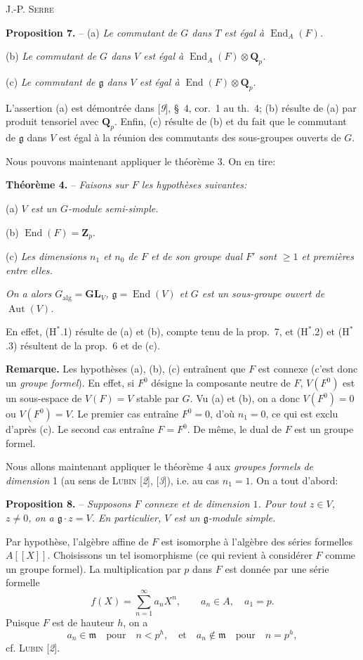 \begin{center}\small J.-P. \textsc{Serre}\end{center}
\textbf{Proposition 7.} -- (a) \textit{Le commutant de $G$ dans $T$ est égal à $\operatorname{End}_A(F)$.}

(b) \textit{Le commutant de $G$ dans $V$ est égal à $\operatorname{End}_A(F)\otimes\mathbf{Q}_p$.}

(c) \textit{Le commutant de $\mathfrak{g}$ dans $V$ est égal à $\operatorname{End}(F)\otimes\mathbf{Q}_p$.}

L’assertion (a) est démontrée dans [\textit{9}], \S~4, cor.~1 au th.~4; (b) résulte de (a) par produit tensoriel avec $\mathbf{Q}_p$. Enfin, (c) résulte de (b) et du fait que le commutant de $\mathfrak{g}$ dans $V$ est égal à la réunion des commutants des sous-groupes ouverts de $G$.

Nous pouvons maintenant appliquer le théorème 3. On en tire:

\textbf{Théorème 4.} -- \textit{Faisons sur $F$ les hypothèses suivantes:}

(a) \textit{$V$ est un $G$-module semi-simple.}

(b) $\operatorname{End}(F)=\mathbf{Z}_p$.

(c) \textit{Les dimensions $n_1$ et $n_0$ de $F$ et de son groupe dual $F'$ sont $\geqslant 1$ et premières entre elles.}

\textit{On a alors $G_{\mathrm{alg}}=\mathbf{GL}_V$, $\mathfrak{g}=\operatorname{End}(V)$ et $G$ est un sous-groupe ouvert de $\operatorname{Aut}(V)$.}

En effet, ($\mathrm{H}^{*}$.1) résulte de (a) et (b), compte tenu de la prop.~7, et ($\mathrm{H}^{*}$.2) et ($\mathrm{H}^{*}$.3) résultent de la prop.~6 et de (c).

\textbf{Remarque.} Les hypothèses (a), (b), (c) entraînent que $F$ est connexe (c’est donc un \textit{groupe formel}). En effet, si $F^0$ désigne la composante neutre de $F$, $V(F^0)$ est un sous-espace de $V(F)=V$ stable par $G$. Vu (a) et (b), on a donc $V(F^0)=0$ ou $V(F^0)=V$. Le premier cas entraîne $F^0=0$, d’où $n_1=0$, ce qui est exclu d’après (c). Le second cas entraîne $F=F^0$.\unsure{-} De même, le dual de $F$ est un groupe formel.

Nous allons maintenant appliquer le théorème 4 aux \textit{groupes formels de dimension} 1 (au sens de \textsc{Lubin} [\textit{2}], [\textit{3}]), i.e. au cas $n_1=1$. On a tout d’abord:

\textbf{Proposition 8.} -- \textit{Supposons $F$ connexe et de dimension $1$. Pour tout $z\in V$, $z\ne0$, on a $\mathfrak{g}\cdot z=V$. En particulier, $V$ est un $\mathfrak{g}$-module simple.}

Par hypothèse, l’algèbre affine de $F$ est isomorphe à l’algèbre des séries formelles $A[[X]]$. Choisissons un tel isomorphisme (ce qui revient à considérer $F$ comme un groupe formel). La multiplication par $p$ dans $F$ est donnée par une série formelle
\[
f(X)=\sum_{n=1}^{\infty}a_nX^n,\qquad a_n\in A,\quad a_1=p.
\]
Puisque $F$ est de hauteur $h$, on a
\[
a_n\in\mathfrak{m}\quad\text{pour}\quad n<p^h,\quad\text{et}\quad a_n\notin\mathfrak{m}\quad\text{pour}\quad n=p^h,
\]
cf. \textsc{Lubin} [\textit{2}].
